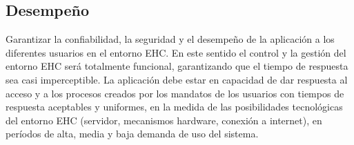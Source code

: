 \subsection{Desempeño}
Garantizar la confiabilidad, la seguridad y el desempe\~no de la aplicaci\'on a los diferentes usuarios en el entorno EHC. En este sentido el control y la gesti\'on del entorno EHC ser\'a totalmente funcional, garantizando que el tiempo de respuesta sea casi imperceptible.
La aplicaci\'on debe estar en capacidad de dar respuesta al acceso y a los procesos creados por los mandatos de los usuarios con tiempos de respuesta aceptables y uniformes, en la medida de las posibilidades tecnol\'ogicas del entorno EHC (servidor, mecanismos hardware, conexi\'on a internet), en per\'iodos de alta, media y baja demanda de uso del sistema.
